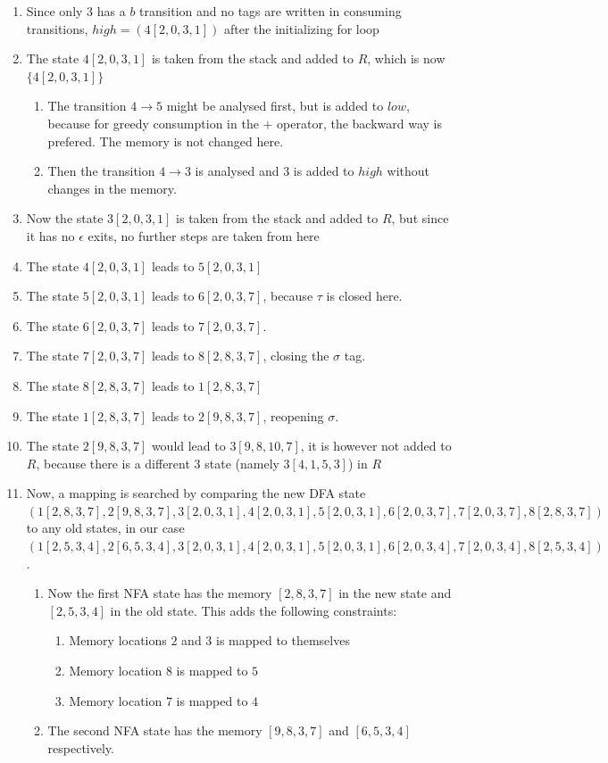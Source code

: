 \documentclass[english]{sigplanconf}
\begin{document}
\begin{enumerate}
\item Since only $3$ has a $b$ transition and no tags are written in consuming
transitions, $high=(4[2,0,3,1])$ after the initializing for loop
\item The state $4[2,0,3,1]$ is taken from the stack and added to $R$,
which is now $\{4[2,0,3,1]\}$ 

\begin{enumerate}
\item The transition $4\rightarrow5$ might be analysed first, but is added
to $low$, because for greedy consumption in the $+$ operator, the
backward way is prefered. The memory is not changed here.
\item Then the transition $4\rightarrow3$ is analysed and $3$ is added
to $high$ without changes in the memory.
\end{enumerate}
\item Now the state $3[2,0,3,1]$ is taken from the stack and added to $R$,
but since it has no $\epsilon$ exits, no further steps are taken
from here
\item The state $4[2,0,3,1]$ leads to $5[2,0,3,1]$
\item The state $5[2,0,3,1]$ leads to $6[2,0,3,7]$, because $\tau$ is
closed here.
\item The state $6[2,0,3,7]$ leads to $7[2,0,3,7]$.
\item The state $7[2,0,3,7]$ leads to $8[2,8,3,7]$, closing the $\sigma$
tag. 
\item The state $8[2,8,3,7]$ leads to $1[2,8,3,7]$
\item The state $1[2,8,3,7]$ leads to $2[9,8,3,7]$, reopening $\sigma$.
\item The state $2[9,8,3,7]$ would lead to $3[9,8,10,7]$, it is however
not added to $R$, because there is a different $3$ state (namely
$3[4,1,5,3]$) in $R$
\item Now, a mapping is searched by comparing the new DFA state $(1[2,8,3,7],2[9,8,3,7],3[2,0,3,1],4[2,0,3,1],5[2,0,3,1],6[2,0,3,7],7[2,0,3,7],8[2,8,3,7])$
to any old states, in our case $(1[2,5,3,4],2[6,5,3,4],3[2,0,3,1],4[2,0,3,1],5[2,0,3,1],6[2,0,3,4],7[2,0,3,4],8[2,5,3,4])$. 

\begin{enumerate}
\item Now the first NFA state has the memory $[2,8,3,7]$ in the new state
and $[2,5,3,4]$ in the old state. This adds the following constraints:

\begin{enumerate}
\item Memory locations $2$ and $3$ is mapped to themselves
\item Memory location $8$ is mapped to $5$
\item Memory location $7$ is mapped to $4$
\end{enumerate}
\item The second NFA state has the memory $[9,8,3,7]$ and $[6,5,3,4]$
respectively.


\end{enumerate}
\end{enumerate}
\end{document}
